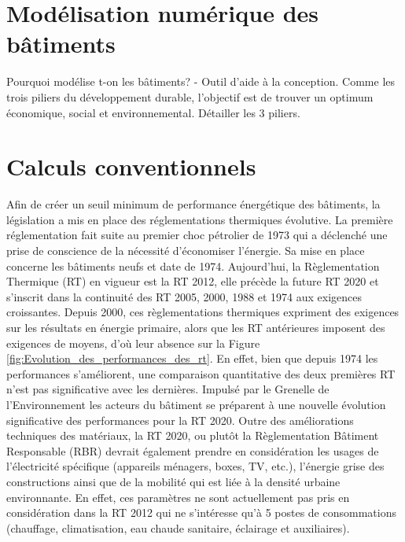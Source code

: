 \section{Modélisation numérique des bâtiments}

Pourquoi modélise t-on les bâtiments?
- Outil d'aide à la conception. Comme les trois piliers du développement durable, l'objectif est de trouver un optimum économique, social et environnemental. Détailler les 3 piliers.

\section{Calculs conventionnels}

Afin de créer un seuil minimum de performance énergétique des bâtiments, la législation a mis en place des réglementations thermiques évolutive. La première réglementation fait suite au premier choc pétrolier de 1973 qui a déclenché une prise de conscience de la nécessité d'économiser l'énergie. Sa mise en place concerne les bâtiments neufs et date de 1974. Aujourd'hui, la Règlementation Thermique (RT) en vigueur est la RT 2012, elle précède la future RT 2020 et s'inscrit dans la continuité des RT 2005, 2000, 1988 et 1974 aux exigences croissantes. Depuis 2000, ces règlementations thermiques expriment des exigences sur les résultats en énergie primaire, alors que les RT antérieures imposent des exigences de moyens, d'où leur absence sur la Figure \ref{fig:Evolution_des_performances_des_rt}. En effet, bien que depuis 1974 les performances s'améliorent, une comparaison quantitative des deux premières RT n'est pas significative avec les dernières. Impulsé par le Grenelle de l'Environnement les acteurs du bâtiment se préparent à une nouvelle évolution significative des performances pour la RT 2020. Outre des améliorations techniques des matériaux, la RT 2020, ou plutôt la Règlementation Bâtiment Responsable (RBR) devrait également prendre en considération les usages de l'électricité spécifique (appareils ménagers, boxes, TV, etc.), l'énergie grise des constructions ainsi que de la mobilité qui est liée à la densité urbaine environnante. En effet, ces paramètres ne sont actuellement pas pris en considération dans la RT 2012 qui ne s'intéresse qu'à 5 postes de consommations (chauffage, climatisation, eau chaude sanitaire, éclairage et auxiliaires).

